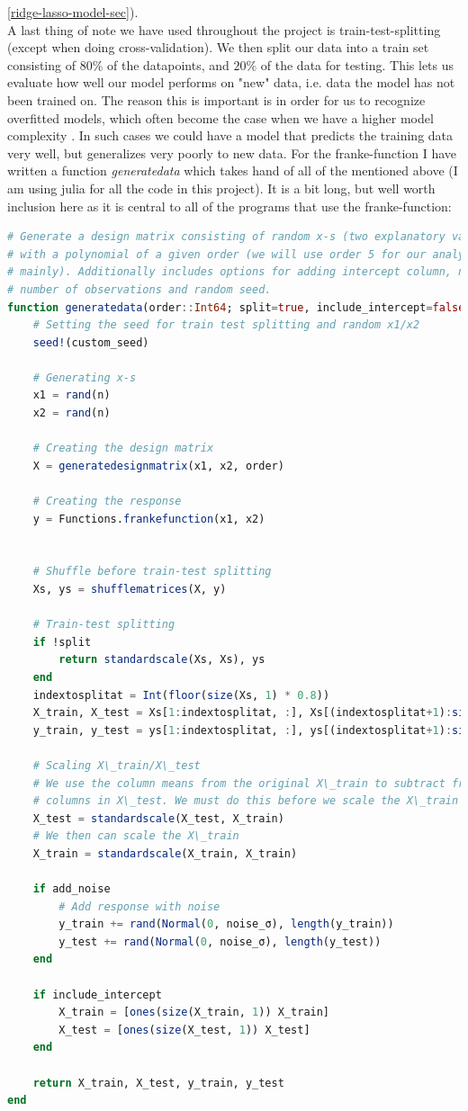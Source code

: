 \documentclass{article}
\begin{document}
\ref{ridge-lasso-model-sec}).
\\
A last thing of note we have used throughout the project is train-test-splitting
(except when doing cross-validation). We then split our data into a train set
consisting of $80\%$ of the datapoints, and $20\%$ of the data for testing.
This lets us evaluate how well our model performs on "new" data, i.e. data the
model has not been trained on. The reason this is important is in order for us
to recognize overfitted models, which often become the case when we have a
higher model complexity \cite[s.~7.2]{hastie2009elements}. In such cases we
could have a model that predicts the training data very well, but generalizes
very poorly to new data.  For the franke-function I have written a function
\textit{generatedata} which takes hand of all of the mentioned above (I am using
julia for all the code in this project). It is a bit long, but well worth
inclusion here as it is central to all of the programs that use the
franke-function:
\begin{lstlisting}[language=julia]
# Generate a design matrix consisting of random x-s (two explanatory variables)
# with a polynomial of a given order (we will use order 5 for our analysis
# mainly). Additionally includes options for adding intercept column, noise,
# number of observations and random seed.
function generatedata(order::Int64; split=true, include_intercept=false, add_noise=false, noise_σ=0.1, n=200, custom_seed=1000)
    # Setting the seed for train test splitting and random x1/x2
    seed!(custom_seed)

    # Generating x-s
    x1 = rand(n)
    x2 = rand(n)

    # Creating the design matrix
    X = generatedesignmatrix(x1, x2, order)

    # Creating the response
    y = Functions.frankefunction(x1, x2)


    # Shuffle before train-test splitting
    Xs, ys = shufflematrices(X, y)

    # Train-test splitting
    if !split
        return standardscale(Xs, Xs), ys
    end
    indextosplitat = Int(floor(size(Xs, 1) * 0.8))
    X_train, X_test = Xs[1:indextosplitat, :], Xs[(indextosplitat+1):size(Xs, 1), :]
    y_train, y_test = ys[1:indextosplitat, :], ys[(indextosplitat+1):size(ys, 1), :]

    # Scaling X\_train/X\_test
    # We use the column means from the original X\_train to subtract from the
    # columns in X\_test. We must do this before we scale the X\_train
    X_test = standardscale(X_test, X_train)
    # We then can scale the X\_train
    X_train = standardscale(X_train, X_train)

    if add_noise
        # Add response with noise
        y_train += rand(Normal(0, noise_σ), length(y_train))
        y_test += rand(Normal(0, noise_σ), length(y_test))
    end

    if include_intercept
        X_train = [ones(size(X_train, 1)) X_train]
        X_test = [ones(size(X_test, 1)) X_test]
    end

    return X_train, X_test, y_train, y_test
end
\end{lstlisting}
\end{document}
